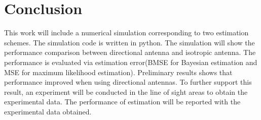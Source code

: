 \chapter{Conclusion}
This work will include a numerical simulation corresponding to two estimation schemes. The simulation code is written in python. The simulation will show the performance comparison between directional antenna and isotropic antenna. The performance is evaluated via estimation error(BMSE for Bayesian estimation and MSE for maximum likelihood estimation). Preliminary results shows that performance improved when using directional antennas. To further support this result, an experiment will be conducted in the line of sight areas to obtain the experimental data. The performance of estimation will be reported with the experimental data obtained.